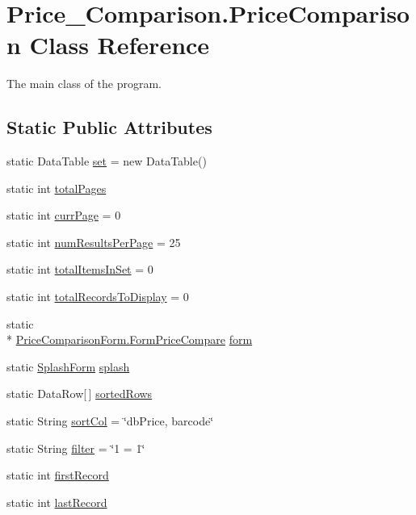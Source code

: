\hypertarget{class_price___comparison_1_1_price_comparison}{\section{Price\-\_\-\-Comparison.\-Price\-Comparison Class Reference}
\label{class_price___comparison_1_1_price_comparison}
}


The main class of the program.  


\subsection*{Static Public Attributes}
\begin{DoxyCompactItemize}
\item 
static Data\-Table \hyperlink{class_price___comparison_1_1_price_comparison_a3d6993277a69f5816e84ceb7aa2a69c0}{set} = new Data\-Table()
\item 
static int \hyperlink{class_price___comparison_1_1_price_comparison_a61b472a9b894cc9f6124cd8450688436}{total\-Pages}
\item 
static int \hyperlink{class_price___comparison_1_1_price_comparison_a36b71cb32784ebb0101e4281f0cb211f}{curr\-Page} = 0
\item 
static int \hyperlink{class_price___comparison_1_1_price_comparison_a03ce8e6d675cf14e9f3ab91015559ae5}{num\-Results\-Per\-Page} = 25
\item 
static int \hyperlink{class_price___comparison_1_1_price_comparison_a1ed3ccdec43ddc79d7d77bb7a8b9657c}{total\-Items\-In\-Set} = 0
\item 
static int \hyperlink{class_price___comparison_1_1_price_comparison_a9e1cc855ebfb83f7acacebd5b50af064}{total\-Records\-To\-Display} = 0
\item 
static \\*
\hyperlink{class_price_comparison_form_1_1_form_price_compare}{Price\-Comparison\-Form.\-Form\-Price\-Compare} \hyperlink{class_price___comparison_1_1_price_comparison_a59d01fc0b61a9d6d4e869663f2b39f78}{form}
\item 
static \hyperlink{class_price___comparison_1_1_splash_form}{Splash\-Form} \hyperlink{class_price___comparison_1_1_price_comparison_a5c27abcda5ec2f037b329583a365e060}{splash}
\item 
static Data\-Row\mbox{[}$\,$\mbox{]} \hyperlink{class_price___comparison_1_1_price_comparison_adc440c55ac225fc7bcf5192a3966638f}{sorted\-Rows}
\item 
static String \hyperlink{class_price___comparison_1_1_price_comparison_a8b976f4f4e8b0a3d60f88ac7d799abec}{sort\-Col} = \char`\"{}db\-Price, barcode\char`\"{}
\item 
static String \hyperlink{class_price___comparison_1_1_price_comparison_a358772462e797f3672e8d5b6113a82d7}{filter} = \char`\"{}1 = 1\char`\"{}
\item 
static int \hyperlink{class_price___comparison_1_1_price_comparison_a52d476d2b6219286b1a8ff308284e95e}{first\-Record}
\item 
static int \hyperlink{class_price___comparison_1_1_price_comparison_a7cbb85e5ca4e62a1f47c3b5dfa9e2659}{last\-Record}
\end{DoxyCompactItemize}
